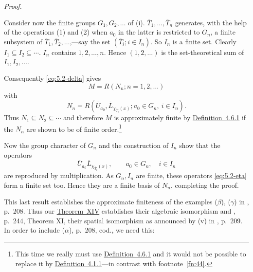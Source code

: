 \documentclass[b5paper,twoside]{article}
\newcommand{\thmref}[2]{\hyperref[#1]{\mbox{Theorem~#2}}}
\newcommand{\defref}[2]{\hyperref[#1]{\mbox{Definition~#2}}}
\theoremstyle{mvnplain}
\renewenvironment{proof}[1][Proof]{%
  \par\addvspace{0.35\baselineskip}%
  \noindent\textit{#1.}\ \normalfont\ignorespaces
}{%
  \par\addvspace{0.35\baselineskip}%
}
\newcommand{\M}{\mathbf M}
\newcommand{\N}{\mathbf N}
\newcommand{\R}{\mathbf R}
\def\M{M}%
\def\N{N}%
\def\R{R}%
\def\mathfrak#1{#1}%
\begin{document}
\begin{proof}
Consider now the finite groups \(\mathfrak G_1,\mathfrak G_2,\ldots\) of
(i). \(\overline T_1,\ldots,\overline T_n\) generates, with the help of the
operations (1) and (2) when \(a_0\) in the latter is restricted to
\(\mathfrak G_n\), a finite subsystem of
\(\overline T_1,\overline T_2,\ldots\),---say the set
\((\overline T_i;i\in I_n)\). So \(I_n\) is a finite set. Clearly
\(I_1\subseteq I_2\subseteq\cdots\). \(I_n\) contains
\(1,2,\ldots,n\). Hence \((1,2,\ldots)\) is the set-theoretical sum of
\(I_1,I_2,\ldots\).

Consequently \eqref{eq:5.2-delta} gives
\begin{equation}\tag{5.2.\(\epsilon\)}\label{eq:5.2-epsilon}
 \M=\R(\N_n;n=1,2,\ldots)
\end{equation}
with
\begin{equation}\tag{5.2.\(\zeta\)}\label{eq:5.2-zeta}
 \N_n=\R(\overline U_{a_0},\overline L_{\chi_{\overline T_i}(x)};
 a_0\in\mathfrak G_n,\ i\in I_n).
\end{equation}
Thus \(\N_1\subseteq\N_2\subseteq\cdots\) and therefore \(\M\) is
approximately finite by \defref{def:4.6.1}{4.6.1} if the \(\N_n\) are shown
to be of finite order.\footnote{This time we really must use
\defref{def:4.6.1}{4.6.1} and it would not be possible to replace it by
\defref{def:4.1.1}{4.1.1}---in contrast with footnote~\ref{fn:44}.}

Now the group character of \(\mathfrak G_n\) and the construction of \(I_n\)
show that the operators
\begin{equation}\tag{5.2.\(\eta\)}\label{eq:5.2-eta}
 \overline U_{a_0}\overline L_{\chi_{\overline T_i}(x)},
 \qquad a_0\in\mathfrak G_n,\quad i\in I_n
\end{equation}
are reproduced by multiplication. As \(\mathfrak G_n,I_n\) are finite, these
operators \eqref{eq:5.2-eta} form a finite set too. Hence they are a finite
basis of \(\N_n\), completing the proof.
\end{proof}

This last result establishes the approximate finiteness of the examples
(\(\beta\)), (\(\gamma\)) in \cite{ref5}, p.~208. Thus our
\thmref{thm:XIV}{XIV} establishes their algebraic isomorphism and
\cite{ref6}, p.~244, Theorem XI, their spatial isomorphism as
announced by (v) in \cite{ref5}, p.~209.
In order to include (\(\alpha\)), p.~208, eod., we need this:
\end{document}
